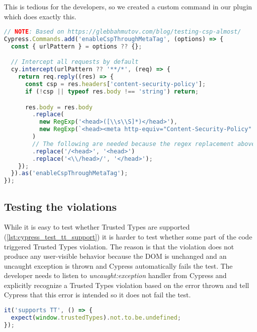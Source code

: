 This is tedious for the developers, so we created a custom command in our plugin which does
exactly this.

\bigskip
\begin{lstlisting}[language=JavaScript, caption=Intercept requests and enable CSP header inside via meta tag]
// NOTE: Based on https://glebbahmutov.com/blog/testing-csp-almost/
Cypress.Commands.add('enableCspThroughMetaTag', (options) => {
  const { urlPattern } = options ?? {};

  // Intercept all requests by default
  cy.intercept(urlPattern ?? '**/*', (req) => {
    return req.reply((res) => {
      const csp = res.headers['content-security-policy'];
      if (!csp || typeof res.body !== 'string') return;

      res.body = res.body
        .replace(
          new RegExp('<head>([\\s\\S]*)</head>'),
          new RegExp(`<head><meta http-equiv="Content-Security-Policy" content="${csp}">$1</head>`).toString()
        )
        // The following are needed because the regex replacement above inserts some characters
        .replace('/<head>', '<head>')
        .replace('<\\/head>/', '</head>');
    });
  }).as('enableCspThroughMetaTag');
});
\end{lstlisting}

\subsection{Testing the violations}

While it is easy to test whether Trusted Types are supported (\ref{lst:cypress_test_tt_support}) it
is harder to test whether some part of the code triggered Trusted Types violation. The reason is
that the violation does not produce any user-visible behavior because the DOM is unchanged and an
uncaught exception is thrown and Cypress automatically fails the test. The developer needs to listen
to \emph{uncaught:exception} handler from Cypress and explicitly recognize a Trusted Types
violation based on the error thrown and tell Cypress that this error is intended so it does not fail
the test.

\vspace{25mm}
\bigskip
\begin{lstlisting}[language=JavaScript, caption=Test Trusted Types support, label={lst:cypress_test_tt_support}]
it('supports TT', () => {
  expect(window.trustedTypes).not.to.be.undefined;
});
\end{lstlisting}
\vspace{3mm}


